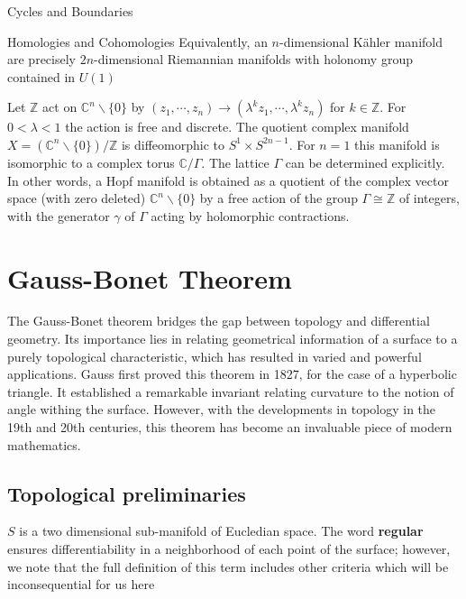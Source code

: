 \begin{subsubsection}{Cycles and Boundaries}
\begin{subsubsection}{Homologies and Cohomologies}
Equivalently, an $n$-dimensional K\"ahler manifold are precisely
$2n$-dimensional Riemannian manifolds with holonomy group contained in $U(1)$
\begin{definition}
Let $\mathbb{Z}$ act on $\mathbb{C}^n \backslash \{0\}$ by $\left(z_1,\cdots,z_n\right)\rightarrow \left(\lambda^k z_1,\cdots,\lambda^k z_n\right)$ for $k\in\mathbb{Z}$. For $0 < \lambda < 1$ the action is free and discrete. The quotient complex manifold $X = \left(\mathbb{C}^n\backslash\{0\}\right)/\mathbb{Z}$ is diffeomorphic to $S^1\times S^{2n-1}$. For $n=1$ this manifold is isomorphic to a complex torus $\mathbb{C}/\Gamma$. The lattice $\Gamma$ can be determined explicitly.\\
In other words,  a Hopf manifold is obtained as a quotient of the complex vector space (with zero deleted) $\mathbb{C}^n \backslash \{0\}$ by a free action of the group $\Gamma \cong \mathbb{Z}$ of integers, with the generator $\gamma$ of $\Gamma$ acting by holomorphic contractions.
\end{definition}
\section{Gauss-Bonet Theorem}

The Gauss-Bonet theorem bridges the gap between topology and differential
geometry. Its importance lies in relating geometrical information of a  surface 
to a purely topological characteristic, which has resulted in varied
and powerful applications. Gauss first proved this theorem in 1827, for
the case of a hyperbolic triangle. It established a remarkable invariant
relating curvature to the notion of angle withing the surface. However,
with the developments in topology in the 19th and 20th centuries, this theorem
has become an invaluable piece of modern mathematics.

\subsection{Topological preliminaries}
\begin{definition}[A surface] $S$ is a two dimensional sub-manifold of
  Eucledian space. The word \textbf{regular} ensures differentiability in
  a neighborhood of each point of the surface; however, we note that
  the full definition of this term includes other criteria which will
  be inconsequential for us here
\end{definition}


\end{subsubsection}
\end{subsubsection}
